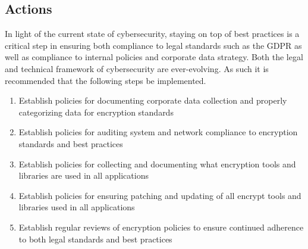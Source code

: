 \subsection{Actions}

In light of the current state of cybersecurity, staying on top of best practices is a critical step in ensuring both compliance to legal standards such as the GDPR as well as compliance to internal policies and corporate data strategy. Both the legal and technical framework of cybersecurity are ever-evolving. As such it is recommended that the following steps be implemented.

\begin{enumerate}
  \item Establish policies for documenting corporate data collection and properly categorizing data for encryption standards
  \item Establish policies for auditing system and network compliance to encryption standards and best practices
  \item Establish policies for collecting and documenting what encryption tools and libraries are used in all applications
  \item Establish policies for ensuring patching and updating of all encrypt tools and libraries used in all applications
  \item Establish regular reviews of encryption policies to ensure continued adherence to both legal standards and best practices
\end{enumerate}
